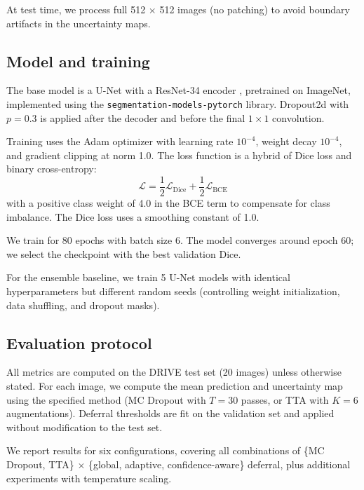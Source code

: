 At test time, we process full 512 $\times$ 512 images (no patching) to
avoid boundary artifacts in the uncertainty maps.

\subsection{Model and training}

The base model is a U-Net \citep{ronneberger2015unet} with a ResNet-34
encoder \citep{he2016deep}, pretrained on ImageNet, implemented using
the \texttt{segmentation-models-pytorch} library. Dropout2d with
$p = 0.3$ is applied after the decoder and before the final $1 \times 1$
convolution.

Training uses the Adam optimizer \citep{kingma2015adam} with learning rate
$10^{-4}$, weight decay $10^{-4}$, and gradient clipping at norm 1.0.
The loss function is a hybrid of Dice loss and binary cross-entropy:
\begin{equation}
  \mathcal{L} = \frac{1}{2}\mathcal{L}_{\text{Dice}} +
  \frac{1}{2}\mathcal{L}_{\text{BCE}}
  \label{eq:loss}
\end{equation}
with a positive class weight of 4.0 in the BCE term to compensate for
class imbalance. The Dice loss uses a smoothing constant of 1.0.

We train for 80 epochs with batch size 6. The model converges around epoch
60; we select the checkpoint with the best validation Dice.

For the ensemble baseline, we train 5 U-Net models with identical
hyperparameters but different random seeds (controlling weight
initialization, data shuffling, and dropout masks).

\subsection{Evaluation protocol}

All metrics are computed on the DRIVE test set (20 images) unless otherwise
stated. For each image, we compute the mean prediction and uncertainty map
using the specified method (MC Dropout with $T = 30$ passes, or TTA with
$K = 6$ augmentations). Deferral thresholds are fit on the validation set
and applied without modification to the test set.

We report results for six configurations, covering all combinations of
\{MC Dropout, TTA\} $\times$ \{global, adaptive, confidence-aware\} deferral,
plus additional experiments with temperature scaling.

